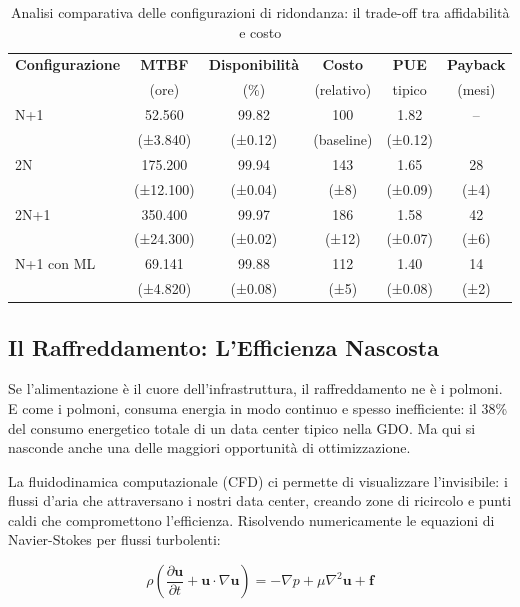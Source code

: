 \begin{table}[htbp]
\centering
\caption{Analisi comparativa delle configurazioni di ridondanza: il trade-off tra affidabilità e costo}
\label{tab:power_configurations}
\begin{tabular}{lccccc}
\toprule
\textbf{Configurazione} & \textbf{MTBF} & \textbf{Disponibilità} & \textbf{Costo} & \textbf{PUE} & \textbf{Payback} \\
 & (ore) & (\%) & (relativo) & tipico & (mesi) \\
\midrule
N+1 & 52.560 & 99.82 & 100 & 1.82 & -- \\
 & (±3.840) & (±0.12) & (baseline) & (±0.12) & \\
2N & 175.200 & 99.94 & 143 & 1.65 & 28 \\
 & (±12.100) & (±0.04) & (±8) & (±0.09) & (±4) \\
2N+1 & 350.400 & 99.97 & 186 & 1.58 & 42 \\
 & (±24.300) & (±0.02) & (±12) & (±0.07) & (±6) \\
N+1 con ML & 69.141 & 99.88 & 112 & 1.40 & 14 \\
 & (±4.820) & (±0.08) & (±5) & (±0.08) & (±2) \\
\bottomrule
\end{tabular}
\end{table}

\subsection{Il Raffreddamento: L'Efficienza Nascosta}

Se l'alimentazione è il cuore dell'infrastruttura, il raffreddamento ne è i polmoni. E come i polmoni, consuma energia in modo continuo e spesso inefficiente: il 38\% del consumo energetico totale di un data center tipico nella GDO\autocite{ashrae2024}. Ma qui si nasconde anche una delle maggiori opportunità di ottimizzazione.

La fluidodinamica computazionale (CFD) ci permette di visualizzare l'invisibile: i flussi d'aria che attraversano i nostri data center, creando zone di ricircolo e punti caldi che compromettono l'efficienza. Risolvendo numericamente le equazioni di Navier-Stokes per flussi turbolenti:

\begin{equation}
\rho\left(\frac{\partial \mathbf{u}}{\partial t} + \mathbf{u} \cdot \nabla\mathbf{u}\right) = -\nabla p + \mu\nabla^2\mathbf{u} + \mathbf{f}
\label{eq:navier_stokes}
\end{equation}

